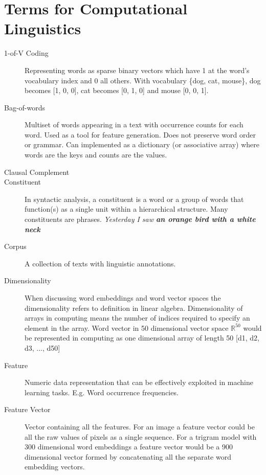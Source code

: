 \documentclass[12pt,a4paper,english
]{tutthesis}
\begin{document}
\section{Terms for Computational Linguistics}
\begin{description}
\item[1-of-V Coding] Representing words as sparse binary vectors which have 1 at the word's vocabulary index and 0 all others. With vocabulary \{dog, cat, mouse\}, dog becomes [1, 0, 0], cat becomes [0, 1, 0] and mouse [0, 0, 1].

\item[Bag-of-words] Multiset of words appearing in a text with occurrence counts for each word. Used as a tool for feature generation. Does not preserve word order or grammar. Can implemented as a dictionary (or associative array) where words are the keys and counts are the values.

\item[Clausal Complement] 

\item[Constituent] In syntactic analysis, a constituent is a word or a group of words that function(s) as a single unit within a hierarchical structure. Many constituents are phrases. \textit{Yesterday I saw \textbf{an orange bird with a white neck}}

\item[Corpus] A collection of texts with linguistic annotations.

\item[Dimensionality] When discussing word embeddings and word vector spaces the dimensionality refers to definition in linear algebra. Dimensionality of arrays in computing means the number of indices required to specify an element in the array. Word vector in 50 dimensional vector space $\mathbb{R}^{50}$ would be represented in computing as one dimensional array of length 50 [d1, d2, d3, ..., d50]

\item[Feature] Numeric data representation that can be effectively exploited in machine learning tasks. E.g. Word occurrence frequencies.

\item[Feature Vector] Vector containing all the features. For an image a feature vector could be all the raw values of pixels as a single sequence. For a trigram model with 300 dimensional word embeddings a feature vector would be a 900 dimensional vector formed by concatenating all the separate word embedding vectors.


\end{description}
\end{document}
